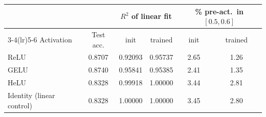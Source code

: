 \begin{tabular}{lccccc}
\toprule
 & & \multicolumn{2}{c}{$R^2$ of linear fit} & \multicolumn{2}{c}{\% pre-act.\ in $[0.5,0.6]$} \\
\cmidrule(lr){3-4}\cmidrule(lr){5-6}
Activation & Test acc. & init & trained & init & trained \\
\midrule
ReLU & 0.8707 & 0.92093 & 0.95737 & 2.65 & 1.26 \\
GELU & 0.8740 & 0.95841 & 0.95385 & 2.41 & 1.35 \\
HeLU & 0.8328 & 0.99918 & 1.00000 & 3.44 & 2.81 \\
Identity (linear control) & 0.8328 & 1.00000 & 1.00000 & 3.45 & 2.80 \\
\bottomrule
\end{tabular}
